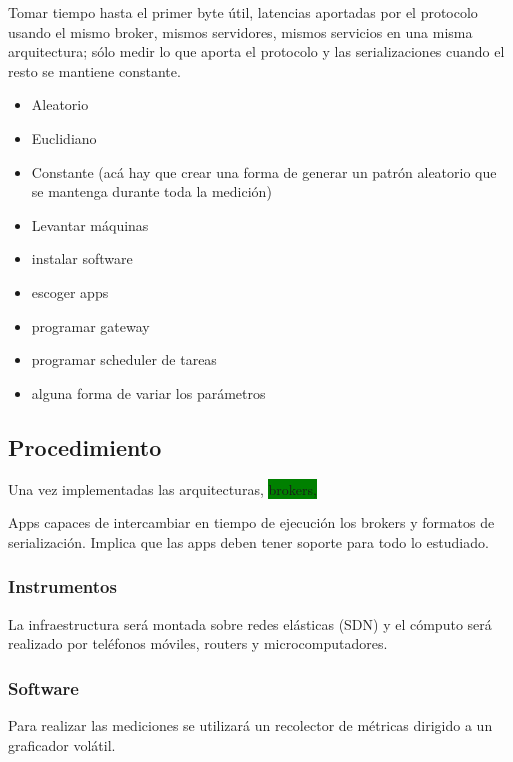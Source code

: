 Tomar tiempo hasta el primer byte útil, latencias aportadas por el protocolo usando el mismo broker, mismos servidores, mismos servicios en una misma arquitectura; sólo medir lo que aporta el protocolo y las serializaciones cuando el resto se mantiene constante.

\begin{itemize}
  \item Aleatorio
  \item Euclidiano
  \item Constante (acá hay que crear una forma de generar un patrón aleatorio que se mantenga durante toda la medición)
\end{itemize}

\begin{itemize}
  \item Levantar máquinas
  \item instalar software
  \item escoger apps
  \item programar gateway
  \item programar scheduler de tareas
  \item alguna forma de variar los parámetros
\end{itemize}

\subsection{Procedimiento}
Una vez implementadas las arquitecturas, \colorbox{green}{brokers, }

Apps capaces de intercambiar en tiempo de ejecución los brokers y formatos de serialización.
Implica que las apps deben tener soporte para todo lo estudiado.


\subsubsection{Instrumentos}
La infraestructura será montada sobre redes elásticas (SDN) y el cómputo será realizado por teléfonos móviles, routers y microcomputadores.

\subsubsection{Software}

Para realizar las mediciones se utilizará un recolector de métricas dirigido a un graficador volátil.

